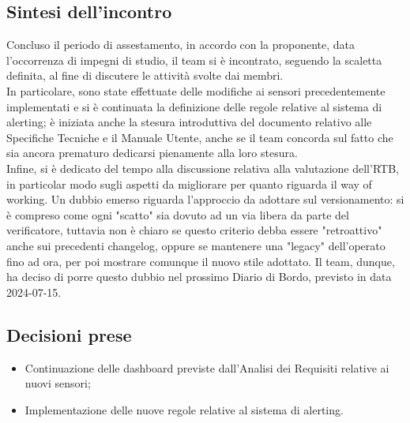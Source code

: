 \documentclass[8pt]{article}
\begin{document}
\subsection{Sintesi dell'incontro}
Concluso il periodo di assestamento, in accordo con la proponente, data l'occorrenza di impegni di studio, il team si è incontrato, seguendo la scaletta definita, al fine di discutere le attività svolte dai membri. \\
In particolare, sono state effettuate delle modifiche ai sensori precedentemente implementati e si è continuata la definizione delle regole relative al sistema di alerting; è iniziata anche la stesura introduttiva del documento relativo alle Specifiche Tecniche e il Manuale Utente, anche se il team concorda sul fatto che sia ancora prematuro dedicarsi pienamente alla loro stesura.\\
Infine, si è dedicato del tempo alla discussione relativa alla valutazione dell'RTB, in particolar modo sugli aspetti da migliorare per quanto riguarda il way of working. Un dubbio emerso riguarda l'approccio da adottare sul versionamento: si è compreso come ogni "scatto" sia dovuto ad un via libera da parte del verificatore, tuttavia non è chiaro se questo criterio debba essere "retroattivo" anche sui precedenti changelog, oppure se mantenere una "legacy" dell'operato fino ad ora, per poi mostrare comunque il nuovo stile adottato. Il team, dunque, ha deciso di porre questo dubbio nel prossimo Diario di Bordo, previsto in data 2024-07-15.
\subsection{Decisioni prese}
\begin{itemize}
	\setlength\itemsep{0em}
	\item Continuazione delle dashboard previste dall'Analisi dei Requisiti relative ai nuovi sensori;
	\item Implementazione delle nuove regole relative al sistema di alerting.
\end{itemize}
\newpage
\end{document}
